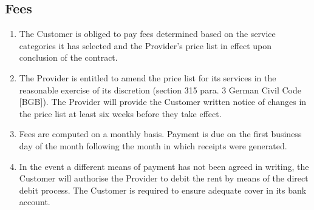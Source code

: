 \documentclass{terms}
\begin{document}
\subsection{Fees}
\begin{enumerate}
\item The Customer is obliged to pay fees determined based on the service categories it has selected and the Provider's price list in effect upon conclusion of the contract.
\item The Provider is entitled to amend the price list for its services in the reasonable exercise of its discretion (section 315 para. 3 German Civil Code [BGB]). The Provider will provide the Customer written notice of changes in the price list at least six weeks before they take effect.
\item Fees are computed on a monthly basis. Payment is due on the first business day of the month following the month in which receipts were generated.
\item In the event a different means of payment has not been agreed in writing, the Customer will authorise the Provider to debit the rent by means of the direct debit process. The Customer is required to ensure adequate cover in its bank account.
\end{enumerate}
\end{document}
